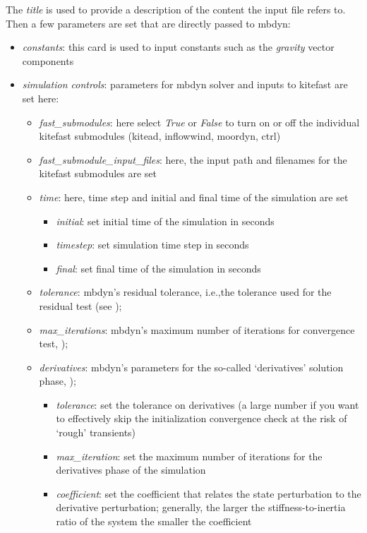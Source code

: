 \documentclass[report]{nrel}
\def\ie{i.e., }
\def\ie{i.e.,}
\begin{document}
The \emph{title} is used to provide a description of the content the input file refers to.
Then a few parameters are set that are directly passed to \gls{mbdyn}:
\begin{itemize}
	\item \emph{constants}: this card is used to input constants such as the \emph{gravity} vector components
%	
	\item \emph{simulation controls}: parameters for \gls{mbdyn} solver and inputs to \gls{kitefast} are set here:
%
	\begin{itemize}
		\item \emph{fast\_submodules}: here select \emph{True} or \emph{False} to turn on or off the individual \gls{kitefast} submodules (\gls{kitead}, \gls{inflowwind}, \gls{moordyn}, \gls{ctrl})
		\item \emph{fast\_submodule\_input\_files}: here, the input path and filenames for the \gls{kitefast} submodules are set
		\item \emph{time}: here, time step and initial and final time of the simulation are set
		\begin{itemize}
			\item \emph{initial}: set initial time of the simulation in seconds
			\item \emph{timestep}: set simulation time step in seconds
			\item \emph{final}: set final time of the simulation in seconds
		\end{itemize}
		\item \emph{tolerance}: \gls{mbdyn}'s residual tolerance, \ie the tolerance used for the residual test (see \cite{masarati2017});
		\item \emph{max\_iterations}: \gls{mbdyn}'s maximum number of iterations for convergence test, \citep[see][]{masarati2017});
		\item \emph{derivatives}: \gls{mbdyn}'s parameters for the so-called `derivatives' solution phase, \citep[see][]{masarati2017});
		\begin{itemize}
			\item \emph{tolerance}: set the tolerance on derivatives (a large number if you want to effectively skip the initialization convergence check at the risk of `rough' transients)
			\item \emph{max\_iteration}: set the maximum number of iterations for the derivatives phase of the simulation
			\item \emph{coefficient}: set the coefficient that relates the state perturbation to the derivative perturbation; generally, the larger the stiffness-to-inertia ratio of the system the smaller the coefficient

\end{itemize}
\end{itemize}
\end{itemize}
\end{document}
